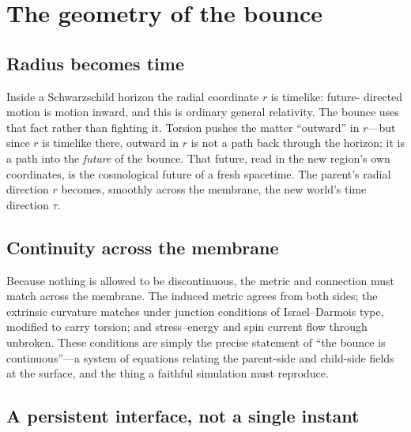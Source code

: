 \section{The geometry of the bounce}

\subsection{Radius becomes time}

Inside a Schwarzschild horizon the radial coordinate $r$ is timelike: future-%
directed motion is motion inward, and this is ordinary general relativity. The
bounce uses that fact rather than fighting it. Torsion pushes the matter
``outward'' in $r$---but since $r$ is timelike there, outward in $r$ is not a
path back through the horizon; it is a path into the \emph{future} of the bounce.
That future, read in the new region's own coordinates, is the cosmological future
of a fresh spacetime. The parent's radial direction $r$ becomes, smoothly across
the membrane, the new world's time direction $\tau$.

\subsection{Continuity across the membrane}

Because nothing is allowed to be discontinuous, the metric and connection must
match across the membrane. The induced metric agrees from both sides; the
extrinsic curvature matches under junction conditions of Israel--Darmois type,
modified to carry torsion; and stress--energy and spin current flow through
unbroken. These conditions are simply the precise statement of ``the bounce is
continuous''---a system of equations relating the parent-side and child-side
fields at the surface, and the thing a faithful simulation must reproduce.

\subsection{A persistent interface, not a single instant}

